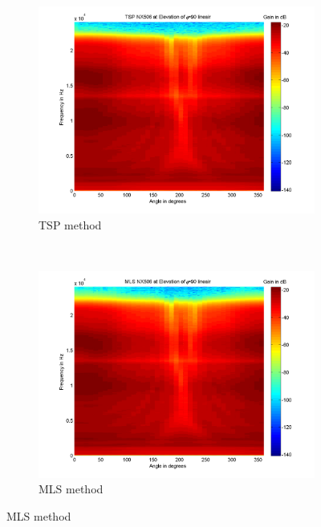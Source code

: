 \begin{figure}[b!]
        \centering
        \begin{subfigure}[t]{0.5\textwidth}
                \centering
			    
    			\includegraphics[width=\textwidth]{afbeeldingen/plots/NX506_TSP_090_lin_full.png}
    			\caption{TSP method}
			    \label{fig:prelim:NX506_TSP_090_full}
        \end{subfigure}~
        \begin{subfigure}[t]{0.5\textwidth}
                \centering
			    
    			\includegraphics[width=\textwidth]{afbeeldingen/plots/NX506_MLS_090_lin_full.png}
    			\caption{MLS method}
			    \label{fig:prelim:NX506_MLS_090_full}
        \end{subfigure}


\end{figure}
